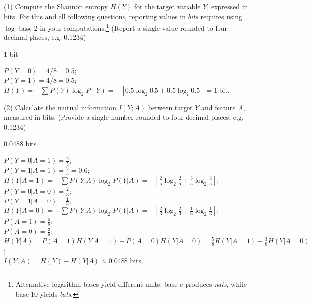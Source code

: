 \documentclass[11pt,addpoints,answers]{exam}
\begin{document}
	
	\begin{questions}
		\item[(1)] Compute the Shannon entropy \(H(Y)\) for the target variable \(Y\), expressed in bits. For this and all following questions, reporting values in \emph{bits} requires using \(\log\) base 2 in your computations.\footnote{Alternative logarithm bases yield different units: base \(e\) produces \emph{nats}, while base 10 yields \emph{bats}.} (Report a single value rounded to four decimal places, e.g. 0.1234)
		
		\begin{minipage}[t]{0.25\textwidth}
			\begin{answer_box}[title=$H(Y)$]
				1 bit
			\end{answer_box}
		\end{minipage}
		\begin{minipage}[t]{0.7\textwidth}
			\begin{answer_box}[title=Work]
				$P(Y = 0) = 4/8 = 0.5;$ \\
				$P(Y = 1) = 4/8 = 0.5;$ \\
				$H(Y) = -\sum P(Y) \log_2 P(Y) = -[0.5 \log_2 0.5 + 0.5 \log_2 0.5] = 1$ bit.
			\end{answer_box}
		\end{minipage}
		
		
		\item[(2)] Calculate the mutual information \(I(Y; A)\) between target \(Y\) and feature \(A\), measured in bits. (Provide a single number rounded to four decimal places, e.g. 0.1234)
		
		\begin{minipage}[t]{0.25\textwidth}
			\begin{answer_box}[title=$I(Y;A)$,height=6cm]
				0.0488 bits
			\end{answer_box}
		\end{minipage}
		\begin{minipage}[t]{0.7\textwidth}
			\begin{answer_box}[title=Work,height=6cm]
				$P(Y=0|A=1)=\frac25;$\\
				$P(Y=1|A=1)=\frac35=0.6;$\\
				$H(Y|A=1)=-\sum P(Y|A) \log_2 P(Y|A) = -[\frac25 \log_2 \frac25 + \frac35 \log_2 \frac35];$ \\
				$P(Y=0|A=0)=\frac23;$\\
				$P(Y=1|A=0)=\frac13;$\\
				$H(Y|A=0)=-\sum P(Y|A) \log_2 P(Y|A) = -[\frac23 \log_2 \frac23 + \frac13 \log_2 \frac13];$\\
				$P(A=1)=\frac58;$\\
				$P(A=0)=\frac38;$\\
				$H(Y|A)=P(A=1)H(Y|A=1)+P(A=0)H(Y|A=0)=\frac58 H(Y|A=1)+\frac38 H(Y|A=0)$;\\
				$I(Y;A) = H(Y) - H(Y|A) \approx 0.0488$ bits. \\
			\end{answer_box}
		\end{minipage}
		

\end{questions}
\end{document}
